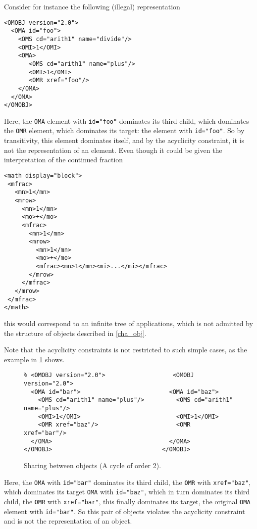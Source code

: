 Consider for instance the following (illegal) \XML representation
\begin{lstlisting}
<OMOBJ version="2.0">
  <OMA id="foo">
    <OMS cd="arith1" name="divide"/>
    <OMI>1</OMI>
    <OMA>
       <OMS cd="arith1" name="plus"/>
       <OMI>1</OMI>
       <OMR xref="foo"/>
    </OMA> 
  </OMA>
</OMOBJ>
\end{lstlisting}

Here, the \lstinline|OMA| element with
\lstinline|id="foo"| dominates its third child, which dominates the
\lstinline|OMR| element, which dominates its target: the element with
\lstinline|id="foo"|. So by transitivity, this element dominates itself, and
by the acyclicity constraint, it is not the \XML representation of an \OM
element. Even though it could be given the interpretation of the continued fraction
\begin{lstlisting}
<math display="block">
 <mfrac>
   <mn>1</mn>
   <mrow>
     <mn>1</mn>
     <mo>+</mo>
     <mfrac>
       <mn>1</mn>
       <mrow>
         <mn>1</mn>
         <mo>+</mo>
         <mfrac><mn>1</mn><mi>...</mi></mfrac>
       </mrow>
     </mfrac>
   </mrow>
 </mfrac>
</math>
\end{lstlisting}
this would correspond to an infinite tree of applications, which is not admitted by the
structure of \OM objects described in \ref{cha_obj}.

Note that the acyclicity constraints is not restricted to such simple cases, as the
example in \ref{fig_sharing_between} shows.

\begin{figure}\centering
\caption{Sharing between \OM objects (A cycle of order 2).}\label{fig_sharing_between}
\begin{lstlisting}
% <OMOBJ version="2.0">                   <OMOBJ version="2.0">
  <OMA id="bar">                         <OMA id="baz">
    <OMS cd="arith1" name="plus"/>         <OMS cd="arith1" name="plus"/>
    <OMI>1</OMI>                           <OMI>1</OMI>
    <OMR xref="baz"/>                      <OMR xref="bar"/>
  </OMA>                                 </OMA>
</OMOBJ>                               </OMOBJ>
\end{lstlisting}
\end{figure}

Here, the \lstinline|OMA| with \lstinline|id="bar"| dominates its third child, the
\lstinline|OMR| with \lstinline|xref="baz"|, which dominates its target \lstinline|OMA|
with \lstinline|id="baz"|, which in turn dominates its third child, the \lstinline|OMR|
with \lstinline|xref="bar"|, this finally dominates its target, the original
\lstinline|OMA| element with \lstinline|id="bar"|. So this pair of \OM objects violates
the acyclicity constraint and is not the \XML representation of an \OM object.

